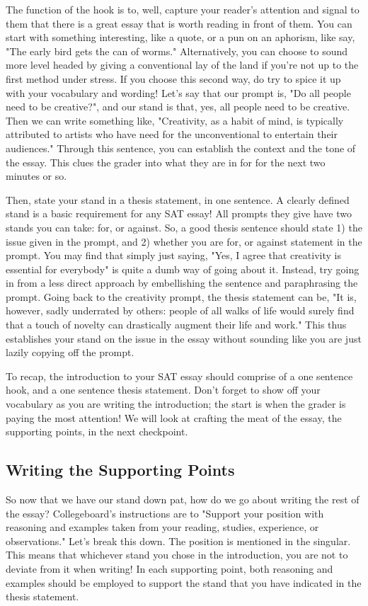 The function of the hook is to, well, capture your reader's attention and signal to them that there is a great essay that is worth reading in front of them. You can start with something interesting, like a quote, or a pun on an aphorism, like say, "The early bird gets the can of worms." Alternatively, you can choose to sound more level headed by giving a conventional lay of the land if you're not up to the first method under stress. If you choose this second way, do try to spice it up with your vocabulary and wording! Let's say that our prompt is, "Do all people need to be creative?", and our stand is that, yes, all people need to be creative. Then we can write something like, "Creativity, as a habit of mind, is typically attributed to artists who have need for the unconventional to entertain their audiences." Through this sentence, you can establish the context and the tone of the essay. This clues the grader into what they are in for for the next two minutes or so.

Then, state your stand in a thesis statement, in one sentence. A clearly defined stand is a basic requirement for any SAT essay! All prompts they give have two stands you can take: for, or against. So, a good thesis sentence should state 1) the issue given in the prompt, and 2) whether you are for, or against statement in the prompt. You may find that simply just saying, "Yes, I agree that creativity is essential for everybody" is quite a dumb way of going about it. Instead, try going in from a less direct approach by embellishing the sentence and paraphrasing the prompt. Going back to the creativity prompt, the thesis statement can be, "It is, however, sadly underrated by others: people of all walks of life would surely find that a touch of novelty can drastically augment their life and work." This thus establishes your stand on the issue in the essay without sounding like you are just lazily copying off the prompt.

To recap, the introduction to your SAT essay should comprise of a one sentence hook, and a one sentence thesis statement. Don't forget to show off your vocabulary as you are writing the introduction; the start is when the grader is paying the most attention! We will look at crafting the meat of the essay, the supporting points, in the next checkpoint.
\subsection{Writing the Supporting Points}
So now that we have our stand down pat, how do we go about writing the rest of the essay? Collegeboard's instructions are to "Support your position with reasoning and examples taken from your reading, studies, experience, or observations." Let's break this down. The position is mentioned in the singular. This means that whichever stand you chose in the introduction, you are not to deviate from it when writing! In each supporting point, both reasoning and examples should be employed to support the stand that you have indicated in the thesis statement. 

